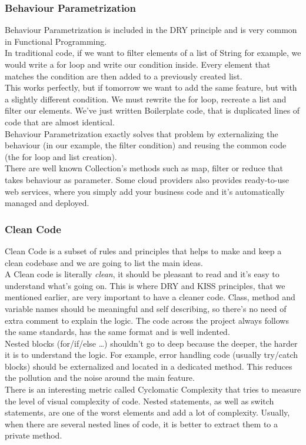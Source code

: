 \subsubsection{Behaviour Parametrization}
Behaviour Parametrization is included in the DRY principle and is very
common in Functional Programming. \\
\newline
In traditional code, if we want to filter elements of a list of String
for example, we would write a for loop and write our condition inside.
Every element that matches the condition are then added to a previously
created list. \\
This works perfectly, but if tomorrow we want to add the same feature,
but with a slightly different condition.
We must rewrite the for loop, recreate a list and filter our elements.
We've just written Boilerplate code, that is duplicated lines of code
that are almost identical. \\
\newline
Behaviour Parametrization exactly solves that problem by externalizing
the behaviour (in our example, the filter condition) and reusing the
common code (the for loop and list creation). \\
There are well known Collection's methods such as map, filter or reduce
that takes behaviour as parameter.
Some cloud providers also provides ready-to-use web services,
where you simply add your business code and it's automatically managed
and deployed.

\subsubsection{Clean Code}
Clean Code is a subset of rules and principles that helps to make and
keep a clean codebase and we are going to list the main ideas. \\
\newline
A Clean code is literally \textit{clean}, it should be
pleasant to read and it's easy to understand what's going on.
This is where DRY and KISS principles, that we mentioned earlier,
are very important to have a cleaner code.
Class, method and variable names should be meaningful and self
describing, so there's no need of extra comment to explain the logic.
The code across the project always follows the same standards, has the
same format and is well indented. \\
\newline
Nested blocks (for/if/else \ldots) shouldn't go to deep
because the deeper, the harder it is to understand the logic.
For example, error handling code (usually try/catch blocks) should be
externalized and located in a dedicated method.
This reduces the pollution and the noise around the main feature. \\
There is an interesting metric called Cyclomatic Complexity that tries to
measure the level of visual complexity of code.
Nested statements, as well as switch statements, are one of the worst
elements and add a lot of complexity.
Usually, when there are several nested lines of code, it is better to
extract them to a private method.

